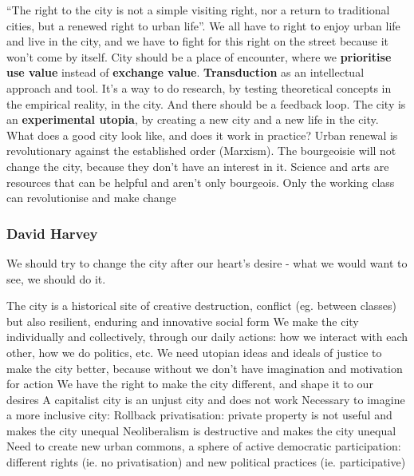 \documentclass{article}
\begin{document}
\begin{outline}
	\1 ``The right to the city is not a simple visiting right, nor a return to traditional cities, but a renewed right to urban life''. We all have to right to enjoy urban life and live in the city, and we have to fight for this right on the street because it won't come by itself. 
	\1 City should be a place of encounter, where we \textbf{prioritise use value} instead of \textbf{exchange value}.
	\1\textbf{Transduction} as an intellectual approach and tool. It's a way to do research, by testing theoretical concepts in the empirical reality, in the city. And there should be a feedback loop.
	\1 The city is an \textbf{experimental utopia}, by creating a new city and a new life in the city. What does a good city look like, and does it work in practice?
	\1Urban renewal is revolutionary against the established order (Marxism). The bourgeoisie will not change the city, because they don't have an interest in it. Science and arts are resources that can be helpful and aren't only bourgeois. Only the working class can revolutionise and make change
\end{outline}

\subsubsection{David Harvey}

We should try to change the city after our heart's desire - what we would want to see, we should do it.

\begin{outline}
	\1 The city is a historical site of creative destruction, conflict (eg. between classes) but also resilient, enduring and innovative social form
	\1 We make the city individually and collectively, through our daily actions: how we interact with each other, how we do politics, etc.
	\1 We need utopian ideas and ideals of justice to make the city better, because without we don't have imagination and motivation for action
	\1 We have the right to make the city different, and shape it to our desires
	\1 A capitalist city is an unjust city and does not work
	\1 Necessary to imagine a more inclusive city:
		\2 Rollback privatisation: private property is not useful and makes the city unequal
		\2 Neoliberalism is destructive and makes the city unequal
		\2 Need to create new urban commons, a sphere of active democratic participation: different rights (ie. no privatisation) and new political practices (ie. participative)
\end{outline}
\end{document}
